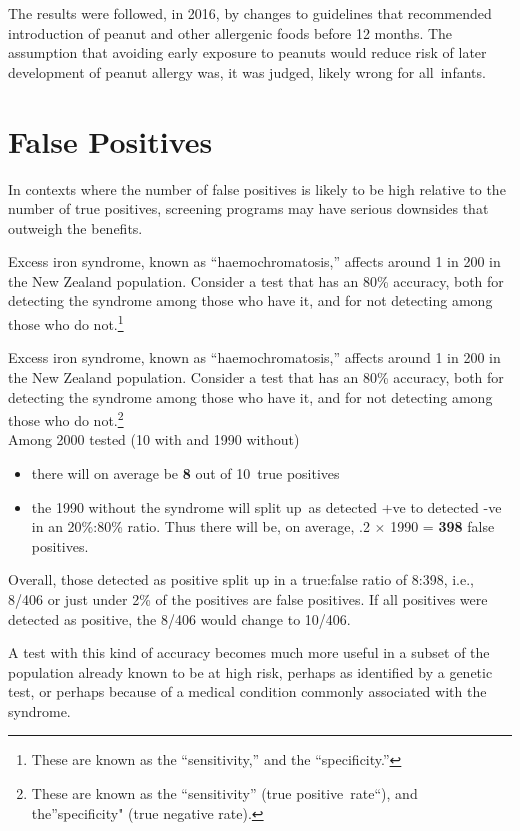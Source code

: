 \documentclass[
  10pt,
  b5paper]{book}
\providecommand{\tightlist}{%
  \setlength{\itemsep}{0pt}\setlength{\parskip}{0pt}}
\begin{document}
The results were followed, in 2016, by changes to guidelines that
recommended introduction of peanut and other allergenic foods
before 12 months. The assumption that avoiding early exposure to
peanuts would reduce risk of later development of peanut allergy
was, it was judged, likely wrong for all~infants.

\hypertarget{false-positives}{%
\section{False Positives}\label{false-positives}}

In contexts where the number of false positives is likely to be
high relative to the number of true positives, screening
programs may have serious downsides that outweigh the benefits.

Excess iron syndrome, known as ``haemochromatosis,'' affects
around 1 in 200 in the New Zealand population. Consider a
test that has an 80\% accuracy, both for detecting the syndrome
among those who have it, and for not detecting among those
who do not.\footnote{These are known as the ``sensitivity,'' and the
  ``specificity.''}

Excess iron syndrome, known as ``haemochromatosis,'' affects
around 1 in 200 in the New Zealand population. Consider a
test that has an 80\% accuracy, both for detecting the syndrome
among those who have it, and for not detecting among those
who do not.\footnote{These are known as the ``sensitivity'' (true
  positive~rate``), and the''specificity" (true negative rate).}\\
Among 2000 tested (10 with and 1990 without)

\begin{itemize}
\tightlist
\item
  there will on average be \textbf{8} out of 10~true positives
\item
  the 1990 without the syndrome will split up~as
  detected +ve to detected -ve in an 20\%:80\% ratio. Thus
  there will be, on average, .2 \(\times\) 1990 = \textbf{398}
  false positives.
\end{itemize}

Overall, those detected as positive split up in a true:false
ratio of 8:398, i.e., 8/406 or just under 2\% of the positives
are false positives. If all positives were detected as
positive, the 8/406 would change to 10/406.

A test with this kind of accuracy becomes much more useful
in a subset of the population already known to be at high
risk, perhaps as identified by a genetic test, or perhaps
because of a medical condition commonly associated with
the syndrome.
\end{document}
